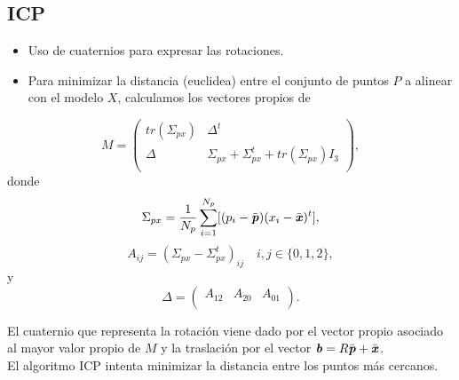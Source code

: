 \documentclass[9pt]{beamer}
\newcommand{\xx}{\textbf{\emph{x}}}
\newcommand{\pp}{\textbf{\emph{p}}}
\newcommand{\bb}{\textbf{\emph{b}}}
\begin{document}
	\subsection{ICP}
	\begin{frame}
		\begin{itemize}
			\item Uso de cuaternios para expresar las rotaciones. 
			\item Para minimizar la distancia (euclidea) entre el conjunto de puntos $ P $ a alinear con el modelo $ X $, calculamos los vectores propios de 
		\end{itemize}
	
		\begin{equation}\label{matCov}
		M  =
		\begin{pmatrix}
		tr(\Sigma_{px}) & \Delta^t \\
		\Delta & \Sigma_{px} + \Sigma_{px}^t + tr(\Sigma_{px})I_3\\
		\end{pmatrix}, 
		\end{equation}
		donde 
		\[
		\Sigma_{px} = \frac{1}{N_p}\sum_{i=1}^{N_p} \lbrack (p_i-\bar{\pp})(x_i - \bar{\xx})^t\rbrack, \]
		\[A_{ij} = (\Sigma_{px}-\Sigma_{px}^t)_{ij} \quad i,j \in \lbrace 0,1,2 \rbrace,\]
		y 
		\[\Delta = \begin{pmatrix}
		A_{12} & A_{20} & A_{01}  \\
		\end{pmatrix}. \]
		
		El cuaternio que representa la rotación viene dado por el vector propio asociado al mayor valor propio de $ M $ y la traslación por el vector $ \bb = R\bar{\pp}  + \bar{\xx} $. \\
		
		El algoritmo ICP intenta minimizar la distancia entre los puntos más cercanos.
	
	\end{frame}
\end{document}
